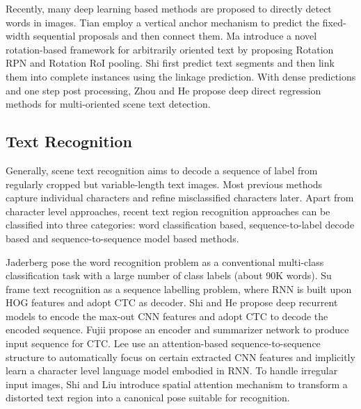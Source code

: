 \documentclass[10pt,twocolumn,letterpaper]{article}
\begin{document}
Recently, many deep learning based methods are proposed to directly detect words in images. Tian \etal \cite{tian2016ctpn} employ a vertical anchor mechanism to predict the fixed-width sequential proposals and then connect them. Ma \etal \cite{ma2017rcnn} introduce a novel rotation-based framework for arbitrarily oriented text by proposing Rotation RPN and Rotation RoI pooling. Shi \etal \cite{shi2017seglink} first predict text segments and then link them into complete instances using the linkage prediction. With dense predictions and one step post processing, Zhou \etal \cite{zhou2017east} and He \etal \cite{he2017casia} propose deep direct regression methods for multi-oriented scene text detection. \subsection{Text Recognition}
Generally, scene text recognition aims to decode a sequence of label from regularly cropped but variable-length text images. Most previous methods \cite{goodfellow2013multi, lee2014region} capture individual characters and refine misclassified characters later. Apart from character level approaches, recent text region recognition approaches can be classified into three categories: word classification based, sequence-to-label decode based and sequence-to-sequence model based methods.

Jaderberg \etal \cite{jaderberg2014synthetic} pose the word recognition problem as a conventional multi-class classification task with a large number of class labels (about 90K words). Su \etal \cite{su2014accurate} frame text recognition as a sequence labelling problem, where RNN is built upon HOG features and adopt CTC as decoder. Shi \etal \cite{shi2016crnn} and He \etal \cite{he2016first} propose deep recurrent models to encode the max-out CNN features and adopt CTC to decode the encoded sequence. Fujii \etal \cite{fujii2017sequence} propose an encoder and summarizer network to produce input sequence for CTC. Lee \etal \cite{lee2016recursive} use an attention-based sequence-to-sequence structure to automatically focus on certain extracted CNN features and implicitly learn a character level language model embodied in RNN. To handle irregular input images, Shi \etal \cite{shi2016robust} and Liu \etal \cite{liu2016star} introduce spatial attention mechanism to transform a distorted text region into a canonical pose suitable for recognition.
\end{document}
